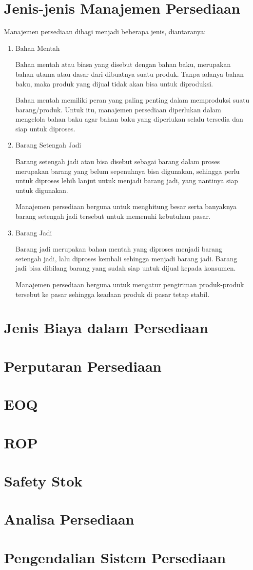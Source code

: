 \section{Jenis-jenis Manajemen Persediaan}

Manajemen persediaan dibagi menjadi beberapa jenis, diantaranya:

\begin{enumerate}
	\item Bahan Mentah
	
	Bahan mentah atau biasa yang disebut dengan bahan baku, merupakan bahan utama atau dasar dari dibuatnya suatu produk. Tanpa adanya bahan baku, maka produk yang dijual tidak akan bisa untuk diproduksi.

	Bahan mentah memiliki peran yang paling penting dalam memproduksi suatu barang/produk. Untuk itu, manajemen persediaan diperlukan dalam mengelola bahan baku agar bahan baku yang diperlukan selalu tersedia dan siap untuk diproses.
	
	\item Barang Setengah Jadi
	
	Barang setengah jadi atau bisa disebut sebagai barang dalam proses merupakan barang yang belum sepenuhnya bisa digunakan, sehingga perlu untuk diproses lebih lanjut untuk menjadi barang jadi, yang nantinya siap untuk digunakan.

	Manajemen persediaan berguna untuk menghitung besar serta banyaknya barang setengah jadi tersebut untuk memenuhi kebutuhan pasar.

	\item Barang Jadi
	
	Barang jadi merupakan bahan mentah yang diproses menjadi barang setengah jadi, lalu diproses kembali sehingga menjadi barang jadi. Barang jadi bisa dibilang barang yang sudah siap untuk dijual kepada konsumen.

	Manajemen persediaan berguna untuk mengatur pengiriman produk-produk tersebut ke pasar sehingga keadaan produk di pasar tetap stabil.
\end{enumerate}

\section{Jenis Biaya dalam Persediaan}



\section{Perputaran Persediaan}
\section{EOQ}
\section{ROP}
\section{Safety Stok}
\section{Analisa Persediaan}
\section{Pengendalian Sistem Persediaan}

